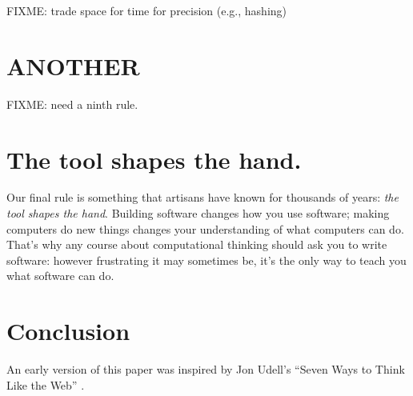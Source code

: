 \documentclass[10pt,letterpaper]{article}
\newcommand{\rulemajor}[1]{\section{#1}}
\begin{document}
FIXME: trade space for time for precision (e.g., hashing)

\rulemajor{ANOTHER}

FIXME: need a ninth rule.

\rulemajor{The tool shapes the hand.}

Our final rule is something that artisans have known for thousands of years:
\emph{the tool shapes the hand}.  Building software changes how you use
software; making computers do new things changes your understanding of what
computers can do.  That's why any course about computational thinking should ask
you to write software: however frustrating it may sometimes be, it's the only
way to teach you what software can do.

\section*{Conclusion}

An early version of this paper was inspired by Jon Udell's ``Seven Ways to Think
Like the Web'' \cite{Udel2011}.


\end{document}
